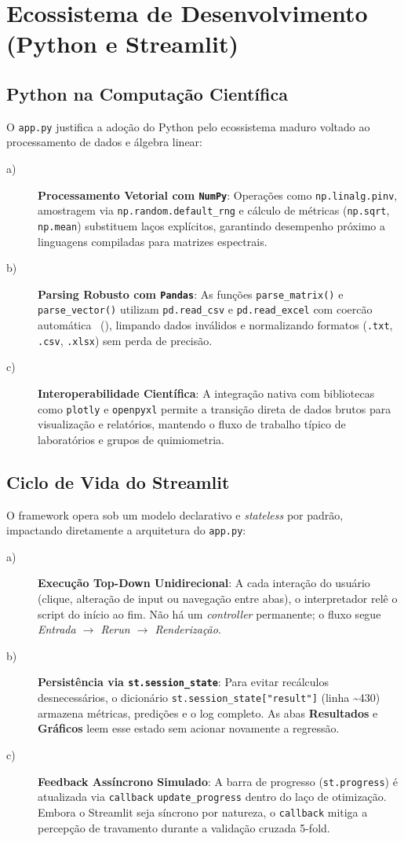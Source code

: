 \chapter{Ecossistema de Desenvolvimento (Python e Streamlit)}
\section{Python na Computação Científica}
O \verb|app.py| justifica a adoção do Python pelo ecossistema maduro voltado ao processamento de dados e álgebra linear:
\begin{description}
\item[a)] \textbf{Processamento Vetorial com \texttt{NumPy}}: Operações como \verb|np.linalg.pinv|, amostragem via \verb|np.random.default_rng| e cálculo de métricas (\verb|np.sqrt|, \verb|np.mean|) substituem laços explícitos, garantindo desempenho próximo a linguagens compiladas para matrizes espectrais.
\item[b)] \textbf{Parsing Robusto com \texttt{Pandas}}: As funções \verb|parse_matrix()| e \verb|parse_vector()| utilizam \verb|pd.read_csv| e \verb|pd.read_excel| com coercão automática ~(), limpando dados inválidos e normalizando formatos (\texttt{.txt}, \texttt{.csv}, \texttt{.xlsx}) sem perda de precisão.
\item[c)] \textbf{Interoperabilidade Científica}: A integração nativa com bibliotecas como \verb|plotly| e \verb|openpyxl| permite a transição direta de dados brutos para visualização e relatórios, mantendo o fluxo de trabalho típico de laboratórios e grupos de quimiometria.
\end{description}

\section{Ciclo de Vida do Streamlit}
O framework opera sob um modelo declarativo e \textit{stateless} por padrão, impactando diretamente a arquitetura do \verb|app.py|:
\begin{description}
\item[a)] \textbf{Execução Top-Down Unidirecional}: A cada interação do usuário (clique, alteração de input ou navegação entre abas), o interpretador relê o script do início ao fim. Não há um \textit{controller} permanente; o fluxo segue \textit{Entrada $\rightarrow$ Rerun $\rightarrow$ Renderização}.
\item[b)] \textbf{Persistência via \texttt{st.session\_state}}: Para evitar recálculos desnecessários, o dicionário \verb|st.session_state["result"]| (linha \textasciitilde 430) armazena métricas, predições e o log completo. As abas \textbf{Resultados} e \textbf{Gráficos} leem esse estado sem acionar novamente a regressão.
\item[c)] \textbf{Feedback Assíncrono Simulado}: A barra de progresso (\verb|st.progress|) é atualizada via \texttt{callback} \verb|update_progress| dentro do laço de otimização. Embora o Streamlit seja síncrono por natureza, o \texttt{callback} mitiga a percepção de travamento durante a validação cruzada 5-fold.
\end{description}

